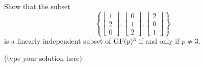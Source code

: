 \begin{ProbBox} %
\begin{problem}[Golan 177]
Show that the subset
\[
\left\{ 
\begin{bmatrix}
  1\\[0.3em] 2\\[0.3em] 0
\end{bmatrix},
\begin{bmatrix}
  0\\[0.3em] 1\\[0.3em] 2
\end{bmatrix},
\begin{bmatrix}
  2\\[0.3em] 0\\[0.3em] 1
\end{bmatrix}
\right\}
\]
is a linearly independent subset of $\operatorname{GF}(p)^3$ if and only if $p\neq 3$.
\end{problem}
\smallskip
\begin{solution}
(type your solution here)
\end{solution}
\end{ProbBox}
\probskip

